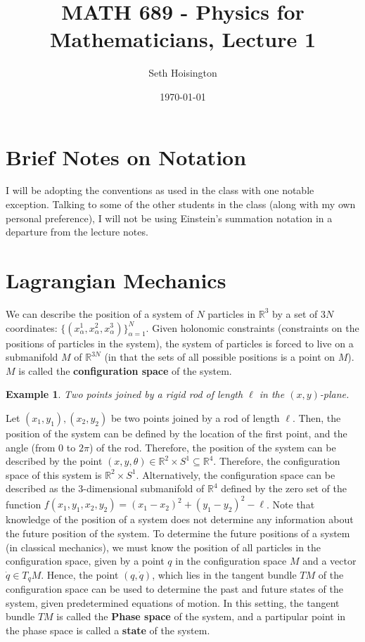 \documentclass{article}
\title{MATH 689 - Physics for Mathematicians, Lecture 1}
\author{Seth Hoisington}
\date{\today}
\newcommand{\R}{\mathbb R}
\newcommand{\nl}{\newline\newline\noindent}
\newcommand{\al}{\alpha}
\newtheorem{ex}{Example}
\begin{document}
\maketitle
\section{Brief Notes on Notation}
I will be adopting the conventions as used in the class with one notable exception. Talking to some of the other students in the class (along with my own personal preference), I will not be using Einstein's summation notation in a departure from the lecture notes.
\section{Lagrangian Mechanics}
We can describe the position of a system of $N$ particles in $\R^3$ by a set of $3N$ coordinates: $\{(x_\al^1,x_\al^2,x_\al^3)\}_{\al=1}^N$. 
\nl
Given holonomic constraints (constraints on the positions of particles in the system), the system of particles is forced to live on a submanifold $M$ of $\R^{3N}$ (in that the sets of all possible positions is a point on $M$). $M$ is called the \textbf{configuration space} of the system.
\begin{ex}
    Two points joined by a rigid rod of length $\ell$ in the $(x,y)$-plane.
\end{ex}
Let $(x_1,y_1), (x_2,y_2)$ be two points joined by a rod of length $\ell$. Then, the position of the system can be defined by the location of the first point, and the angle (from $0$ to $2\pi$) of the rod. Therefore, the position of the system can be described by the point $(x,y,\theta)\in \R^2\times S^1\subseteq \R^4$. Therefore, the configuration space of this system is $\R^2\times S^1$. Alternatively, the configuration space can be described as the 3-dimensional submanifold of $\R^4$ defined by the zero set of the function $f(x_1,y_1,x_2,y_2)=(x_1-x_2)^2+(y_1-y_2)^2-\ell$.
\nl
Note that knowledge of the position of a system does not determine any information about the future position of the system. To determine the future positions of a system (in classical mechanics), we must know the position of all particles in the configuration space, given by a point $q$ in the configuration space $M$ and a vector $\dot q\in T_qM$. Hence, the point $(q,\dot q)$, which lies in the tangent bundle $TM$ of the configuration space can be used to determine the past and future states of the system, given predetermined equations of motion. In this setting, the tangent bundle $TM$ is called the \textbf{Phase space} of the system, and a partipular point in the phase space is called a \textbf{state} of the system.
\end{document}
